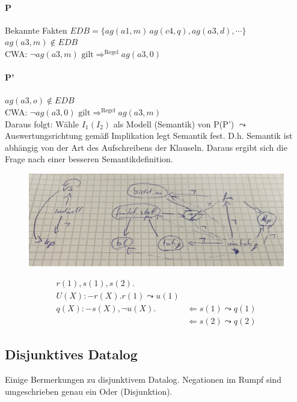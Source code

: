 \documentclass[12pt, a4paper]{article}
\begin{document}
\paragraph{P}
Bekannte Fakten $EDB = \{ ag(a1,m)\, ag(c4,q), ag(a3,d), \cdots \}$ \\
$ag(a3, m) \not \in EDB$ \\
CWA: $\lnot ag(a3, m) \text{ gilt} \Rightarrow^{\text{Regel}} ag(a3,0)$ \\

\paragraph{P'}
$ag(a3, o) \not \in EDB$ \\
CWA: $\lnot ag(a3, 0) \text{ gilt} \Rightarrow^{\text{Regel}} ag(a3,m)$ \\

Daraus folgt: Wähle $I_1(I_2)$ als Modell (Semantik) von P(P') $\leadsto$ Auswertungsrichtung gemäß Implikation legt Semantik fest. D.h. Semantik ist abhängig von der Art des Aufschreibens der Klauseln. Daraus ergibt sich die Frage nach einer besseren Semantikdefinition.

\begin{figure}[h!]
\centering
\includegraphics[width=0.95\linewidth]{img/img15}
\caption{}
\label{fig:img15}
\end{figure}

\begin{align*}
r(1), s(1), s(2).& \\
U(X) :- r(X). r(1) \leadsto u(1)& \\
q(X) :- s(X), \lnot u(X).& \Leftarrow s(1) \leadsto q(1)\\
& \Leftarrow s(2) \leadsto q(2)
\end{align*}

\subsection*{Disjunktives Datalog}
Einige Bermerkungen zu disjunktivem Datalog. Negationen im Rumpf sind umgeschrieben genau ein Oder (Disjunktion).
\end{document}

